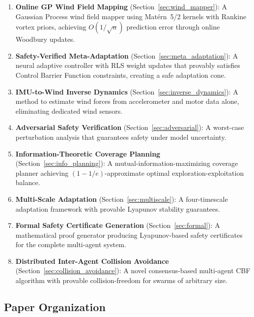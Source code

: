 \documentclass[11pt,twocolumn]{article}
\theoremstyle{definition}
\begin{document}
\begin{enumerate}[leftmargin=*, label=\textbf{C\arabic*}]
    \item \textbf{Online GP Wind Field Mapping} (Section~\ref{sec:wind_mapper}): A Gaussian Process wind field mapper using Mat\'ern~5/2 kernels with Rankine vortex priors, achieving $O(1/\sqrt{n})$ prediction error through online Woodbury updates.
    
    \item \textbf{Safety-Verified Meta-Adaptation} (Section~\ref{sec:meta_adaptation}): A neural adaptive controller with RLS weight updates that provably satisfies Control Barrier Function constraints, creating a safe adaptation cone.
    
    \item \textbf{IMU-to-Wind Inverse Dynamics} (Section~\ref{sec:inverse_dynamics}): A method to estimate wind forces from accelerometer and motor data alone, eliminating dedicated wind sensors.
    
    \item \textbf{Adversarial Safety Verification} (Section~\ref{sec:adversarial}): A worst-case perturbation analysis that guarantees safety under model uncertainty.
    
    \item \textbf{Information-Theoretic Coverage Planning} (Section~\ref{sec:info_planning}): A mutual-information-maximizing coverage planner achieving $(1-1/e)$-approximate optimal exploration-exploitation balance.
    
    \item \textbf{Multi-Scale Adaptation} (Section~\ref{sec:multiscale}): A four-timescale adaptation framework with provable Lyapunov stability guarantees.
    
    \item \textbf{Formal Safety Certificate Generation} (Section~\ref{sec:formal}): A mathematical proof generator producing Lyapunov-based safety certificates for the complete multi-agent system.
    
    \item \textbf{Distributed Inter-Agent Collision Avoidance} (Section~\ref{sec:collision_avoidance}): A novel consensus-based multi-agent CBF algorithm with provable collision-freedom for swarms of arbitrary size.
\end{enumerate}

\subsection{Paper Organization}
\label{sec:organization}
\end{document}
